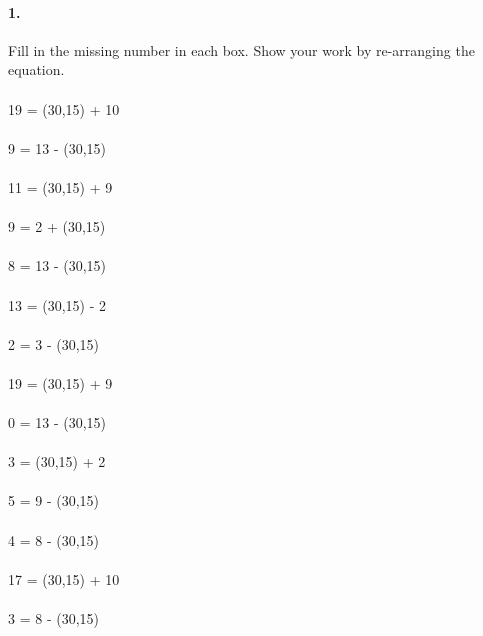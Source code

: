 \documentclass[12pt]{article}
\begin{document}
\paragraph{1.}
Fill in the missing number in each box. Show your work by re-arranging the equation. \\
\\
19 = \framebox(30,15){} + 10
\\
\\
9 = 13 - \framebox(30,15){}
\\
\\
11 = \framebox(30,15){} + 9
\\
\\
9 = 2 + \framebox(30,15){}
\\
\\
8 = 13 - \framebox(30,15){}
\\
\\
13 = \framebox(30,15){} - 2
\\
\\
2 = 3 - \framebox(30,15){}
\\
\\
19 = \framebox(30,15){} + 9
\\
\\
0 = 13 - \framebox(30,15){}
\\
\\
3 = \framebox(30,15){} + 2
\\
\\
5 = 9 - \framebox(30,15){}
\\
\\
4 = 8 - \framebox(30,15){}
\\
\\
17 = \framebox(30,15){} + 10
\\
\\
3 = 8 - \framebox(30,15){}

\newpage
\end{document}
